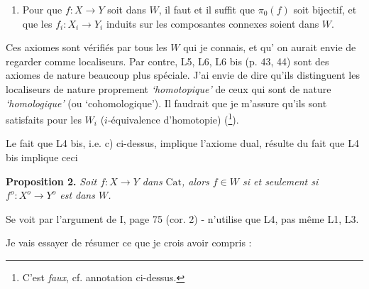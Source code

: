 \documentclass[11pt]{article}
\newcommand{\printedpage}[1]{\marginpar{\footnotesize p.~#1}}
\newcommand{\msp}[1]{\marginpar{\footnotesize [#1]}}
\newcommand{\Cat}{\mathrm{Cat}}
\begin{document}
\printedpage{29}

\begin{enumerate}[leftmargin=*]
\item[d)] Pour que $f : X \longrightarrow Y$ soit dans $W$, il faut et il suffit que $\pi_0(f)$ soit bijectif, et que les $f_i : X_i \longrightarrow Y_i$ induits sur les composantes connexes soient dans $W$.
\end{enumerate}

Ces axiomes sont vérifiés par tous les $W$ qui je connais, et qu' on aurait envie de regarder comme localiseurs. Par contre, L5, L6, L6 bis (p. 43, 44) sont des axiomes de nature beaucoup plus spéciale. J'ai envie de dire qu'ils distinguent les localiseurs de nature proprement \textit{`homotopique'} de ceux qui sont de nature \textit{`homologique'} (ou `cohomologique'). Il faudrait que je m'assure qu'ils sont satisfaits pour les $W_i$ ($i$-équivalence d'homotopie) (\footnote[32]{C'est \textit{faux}, cf. annotation ci-dessus.}). %

Le fait que L4 bis, i.e. c) ci-dessus, implique l'axiome dual, résulte du fait que L4 bis implique ceci

\textbf{Proposition 2.} \textit{Soit $f : X \longrightarrow Y$ dans} $\Cat$\textit{, alors $f \in W$ si et seulement si $f^o : X^o \longrightarrow Y^o$ est dans $W$.}

Se voit par l'argument de I, page 75 (cor. 2) - n'utilise que L4, pas même L1, L3.

\msp{page 46}

Je vais essayer de résumer ce que je crois avoir compris :
\end{document}
